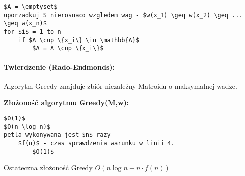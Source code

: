 \begin{lstlisting}[caption={Greedy(M,w)}]
$A = \emptyset$
uporzadkuj S nierosnaco wzgledem wag - $w(x_1) \geq w(x_2) \geq ... \geq w(x_n)$
for $i$ = 1 to n
	if $A \cup \{x_i\} \in \mathbb{A}$
		$A = A \cup \{x_i\}$
\end{lstlisting}

\paragraph{Twierdzenie (Rado-Endmonds):} Algorytm Greedy znajduje zbiór niezależny Matroidu o maksymalnej wadze.

\textbf{Złożoność algorytmu Greedy(M,w):}
\begin{lstlisting}
$O(1)$
$O(n \log n)$
petla wykonywana jest $n$ razy
	$f(n)$ - czas sprawdzenia warunku w linii 4. 
		$O(1)$
\end{lstlisting}
\underline{Ostateczna złożoność Greedy $O(n \log n + n \cdot f(n))$}
